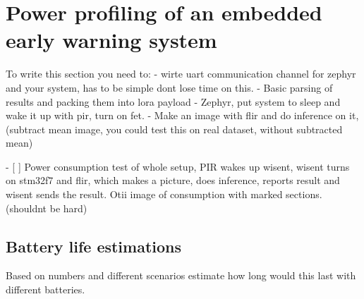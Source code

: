 





\section{ Power profiling of an embedded early warning system}

To write this section you need to:
 - wirte uart communication channel for zephyr and your system, has to be simple dont lose time on this.
 - Basic parsing of results and packing them into lora payload
 - Zephyr, put system to sleep and wake it up with pir, turn on fet.
 - Make an image with flir and do inference on it, (subtract mean image, you could test this on real dataset, without subtracted mean)

- [ ] Power consumption test of whole setup, 
      PIR wakes up wisent, 
      wisent turns on stm32f7 and flir, 
      which makes a picture, does inference, reports result and wisent sends the result. 
      Otii image of consumption with marked sections.(shouldnt be hard)

\subsection{ Battery life estimations}
Based on numbers and different scenarios estimate how long would this last with different batteries.
